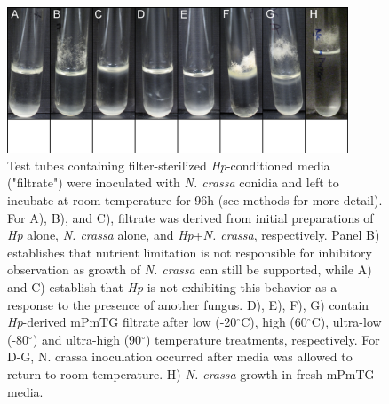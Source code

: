 \begin{figure}[hb]
  \centering
  \includegraphics[width=4in]{./Chapter_Inhibition/img/96h_HpNcColdHotFresh.png}
  \caption[Conditioned media inhibits \textit{N. crassa} growth.]{Test tubes containing filter-sterilized \textit{Hp}-conditioned media ("filtrate") were inoculated with \textit{N. crassa} conidia and left to incubate at room temperature for 96h (see methods for more detail). For A), B), and C), filtrate was derived from initial preparations of \textit{Hp} alone, \textit{N. crassa} alone, and \textit{Hp}+\textit{N. crassa}, respectively. Panel B) establishes that nutrient limitation is not responsible for inhibitory observation as growth of \textit{N. crassa} can still be supported, while A) and C) establish that \textit{Hp} is not exhibiting this behavior as a response to the presence of another fungus. D), E), F), G) contain \textit{Hp}-derived mPmTG filtrate after low (-20$^{\circ}$C), high (60$^{\circ}$C), ultra-low (-80$^{\circ}$) and ultra-high (90$^{\circ}$) temperature treatments, respectively. For D-G, N. crassa inoculation occurred after media was allowed to return to room temperature. H) \textit{N. crassa} growth in fresh mPmTG media.}
  \label{fig:ChInhib_FilterTempAssay}
\end{figure}

